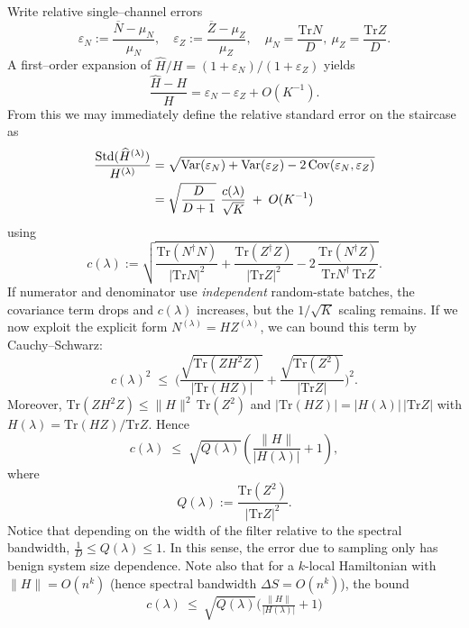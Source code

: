 \documentclass[reprint, aps,prx,showpacs,bibfootnote,preprintnumbers, mathtools, superscriptaddress, amsmath,amssymb]{revtex4-2}
\begin{document}
Write relative single–channel errors
\[
\varepsilon_N:=\frac{\overline N-\mu_N}{\mu_N},\quad
\varepsilon_Z:=\frac{\overline Z-\mu_Z}{\mu_Z},\quad
\mu_N=\frac{\mathrm{Tr}N}{D},\ \mu_Z=\frac{\mathrm{Tr}Z}{D}.
\]
A first–order expansion of \(\widehat H/H=(1+\varepsilon_N)/(1+\varepsilon_Z)\) yields
\[
\frac{\widehat H-H}{H}=\varepsilon_N-\varepsilon_Z+O(K^{-1}).
\]
From this we may immediately define the relative standard error on the staircase as
\begin{align}
\frac{\mathrm{Std}(\widehat H^{(\lambda)})}{H^{(\lambda)}}&=\sqrt{\mathrm{Var}(\varepsilon_N)+\mathrm{Var}(\varepsilon_Z)-2\,\mathrm{Cov}(\varepsilon_N,\varepsilon_Z)}
\notag\\
&=\sqrt{\frac{D}{D+1}}\ \frac{c(\lambda)}{\sqrt{K}} \;+\; O(K^{-1})
\label{eq:A5}
\end{align}
using
\begin{equation}
c(\lambda):=\sqrt{\frac{\mathrm{Tr}(N^\dagger N)}{|\mathrm{Tr}N|^2}
+\frac{\mathrm{Tr}(Z^\dagger Z)}{|\mathrm{Tr}Z|^2}
-2\,\frac{\mathrm{Tr}(N^\dagger Z)}{\mathrm{Tr}N^\dagger\,\mathrm{Tr}Z}}.
\label{eq:A6}
\end{equation}
If numerator and denominator use \emph{independent} random-state batches, the covariance term drops and \(c(\lambda)\) increases, but the \(1/\sqrt{K}\) scaling remains. If we now exploit the explicit form $N^{(\lambda)}=H Z^{(\lambda)}$, we can bound this term by Cauchy–Schwarz:
\begin{equation}
c(\lambda)^2
\;\le\;
\Bigg(\frac{\sqrt{\mathrm{Tr}(Z H^2 Z)}}{|\mathrm{Tr}(HZ)|}
      +\frac{\sqrt{\mathrm{Tr}(Z^2)}}{|\mathrm{Tr}Z|}\Bigg)^2.
\end{equation}
Moreover, $\mathrm{Tr}(Z H^2 Z)\le \|H\|^2\,\mathrm{Tr}(Z^2)$ and
$|\mathrm{Tr}(HZ)|=|H(\lambda)|\,|\mathrm{Tr}Z|$ with
$H(\lambda)=\mathrm{Tr}(HZ)/\mathrm{Tr}Z$. Hence
\begin{equation}
c(\lambda)\;\le\;\sqrt{Q(\lambda)}\left(\frac{\|H\|}{|H(\lambda)|}+1\right),
\end{equation}
where
\begin{equation}
Q(\lambda):=\frac{\mathrm{Tr}(Z^2)}{|\mathrm{Tr}Z|^2}.
\end{equation}
Notice that depending on the width of the filter relative to the spectral bandwidth,  $\frac{1}{D} \leq Q(\lambda) \leq 1$. In this sense, the error due to sampling only has benign system size dependence. Note also that for a $k$-local Hamiltonian with $\|H\|=O(n^k)$ (hence spectral bandwidth
$\Delta S=O(n^k)$), the bound
\[
c(\lambda)\ \le\ \sqrt{Q(\lambda)}\Big(\tfrac{\|H\|}{|H(\lambda)|}+1\Big)
\]
\end{document}
